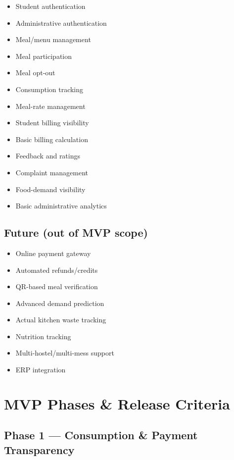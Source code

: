 \documentclass[12pt,a4paper]{article}
\begin{document}
\begin{itemize}
    \item Student authentication
    \item Administrative authentication
    \item Meal/menu management
    \item Meal participation
    \item Meal opt-out
    \item Consumption tracking
    \item Meal-rate management
    \item Student billing visibility
    \item Basic billing calculation
    \item Feedback and ratings
    \item Complaint management
    \item Food-demand visibility
    \item Basic administrative analytics
\end{itemize}

\subsection*{Future (out of MVP scope)}

\begin{itemize}
    \item Online payment gateway
    \item Automated refunds/credits
    \item QR-based meal verification
    \item Advanced demand prediction
    \item Actual kitchen waste tracking
    \item Nutrition tracking
    \item Multi-hostel/multi-mess support
    \item ERP integration
\end{itemize}


\section{MVP Phases \& Release Criteria}

\subsection*{Phase 1 --- Consumption \& Payment Transparency}
\end{document}
